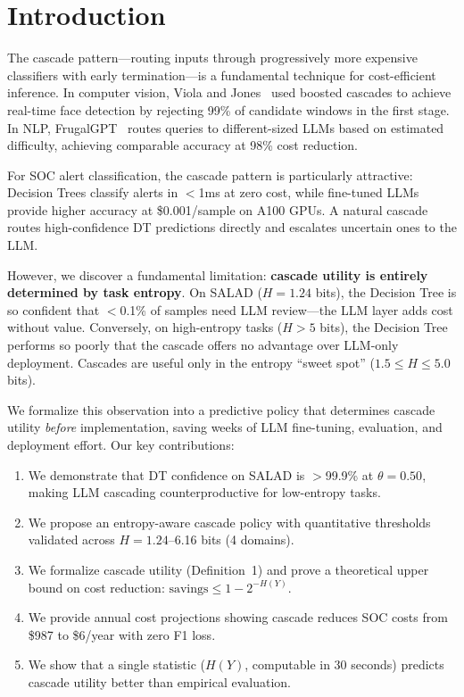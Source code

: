 \documentclass[review,3p]{elsarticle}
\begin{document}
\section{Introduction}

The cascade pattern---routing inputs through progressively more expensive classifiers with early termination---is a fundamental technique for cost-efficient inference. In computer vision, Viola and Jones~\cite{viola2001} used boosted cascades to achieve real-time face detection by rejecting 99\% of candidate windows in the first stage. In NLP, FrugalGPT~\cite{chen2023} routes queries to different-sized LLMs based on estimated difficulty, achieving comparable accuracy at 98\% cost reduction.

For SOC alert classification, the cascade pattern is particularly attractive: Decision Trees classify alerts in $<$1ms at zero cost, while fine-tuned LLMs provide higher accuracy at \$0.001/sample on A100 GPUs. A natural cascade routes high-confidence DT predictions directly and escalates uncertain ones to the LLM.

However, we discover a fundamental limitation: \textbf{cascade utility is entirely determined by task entropy}. On SALAD ($H=1.24$ bits), the Decision Tree is so confident that $<$0.1\% of samples need LLM review---the LLM layer adds cost without value. Conversely, on high-entropy tasks ($H>5$ bits), the Decision Tree performs so poorly that the cascade offers no advantage over LLM-only deployment. Cascades are useful only in the entropy ``sweet spot'' ($1.5 \leq H \leq 5.0$ bits).

We formalize this observation into a predictive policy that determines cascade utility \emph{before} implementation, saving weeks of LLM fine-tuning, evaluation, and deployment effort. Our key contributions:
\begin{enumerate}
\item We demonstrate that DT confidence on SALAD is $>$99.9\% at $\theta=0.50$, making LLM cascading counterproductive for low-entropy tasks.
\item We propose an entropy-aware cascade policy with quantitative thresholds validated across $H=1.24$--6.16 bits (4 domains).
\item We formalize cascade utility (Definition~1) and prove a theoretical upper bound on cost reduction: $\text{savings} \leq 1 - 2^{-H(Y)}$.
\item We provide annual cost projections showing cascade reduces SOC costs from \$987 to \$6/year with zero F1 loss.
\item We show that a single statistic ($H(Y)$, computable in 30 seconds) predicts cascade utility better than empirical evaluation.
\end{enumerate}
\end{document}
